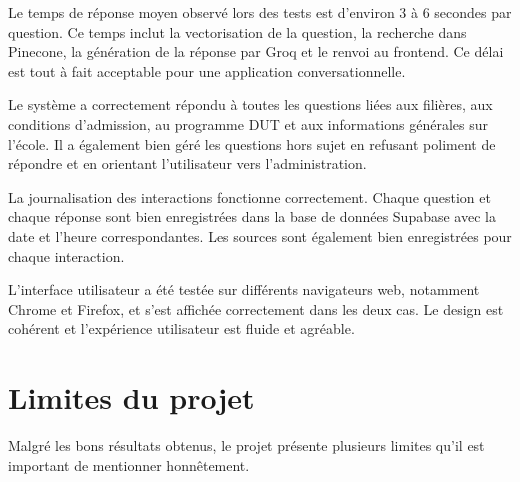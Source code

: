 \documentclass[12pt, a4paper, twoside]{report}
\begin{document}
Le temps de réponse moyen observé lors des tests est d'environ 3 à 6 secondes par question. Ce temps inclut la vectorisation de la question, la recherche dans Pinecone, la génération de la réponse par Groq et le renvoi au frontend. Ce délai est tout à fait acceptable pour une application conversationnelle.

Le système a correctement répondu à toutes les questions liées aux filières, aux conditions d'admission, au programme DUT et aux informations générales sur l'école. Il a également bien géré les questions hors sujet en refusant poliment de répondre et en orientant l'utilisateur vers l'administration.

La journalisation des interactions fonctionne correctement. Chaque question et chaque réponse sont bien enregistrées dans la base de données Supabase avec la date et l'heure correspondantes. Les sources sont également bien enregistrées pour chaque interaction.

L'interface utilisateur a été testée sur différents navigateurs web, notamment Chrome et Firefox, et s'est affichée correctement dans les deux cas. Le design est cohérent et l'expérience utilisateur est fluide et agréable.

\section{Limites du projet}
Malgré les bons résultats obtenus, le projet présente plusieurs limites qu'il est important de mentionner honnêtement.
\end{document}
